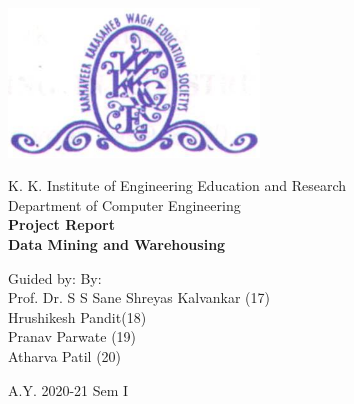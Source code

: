 \begin{titlepage}
    \begin{center}
        \begin{center}
             \includegraphics[width=0.5\textwidth]{figures/collegelogo.png}
        \end{center}
        \Large
        K. K. Institute of Engineering Education and Research\\
        Department of Computer Engineering\\
        \vspace{0.5 in}
        \Huge
        \textbf{Project Report}\\
        \vspace*{0.5 in}
        \Large
        \textbf{Data Mining and Warehousing}
        \vspace{1 in}
                
        \Large
        Guided by:                  \hfill                 By: \hspace*{1.35in} \\
        Prof. Dr. S S Sane     \hfill           Shreyas Kalvankar (17)\\
        				\hspace{2.95 in}			 Hrushikesh Pandit(18)\\
        				\hspace{2.8 in}			 Pranav Parwate (19)\\
        				\hspace{2.55 in}			 Atharva Patil (20)\\
        
        \vspace*{1 in}
        
        A.Y. 2020-21 Sem I
    \end{center}
\end{titlepage}
